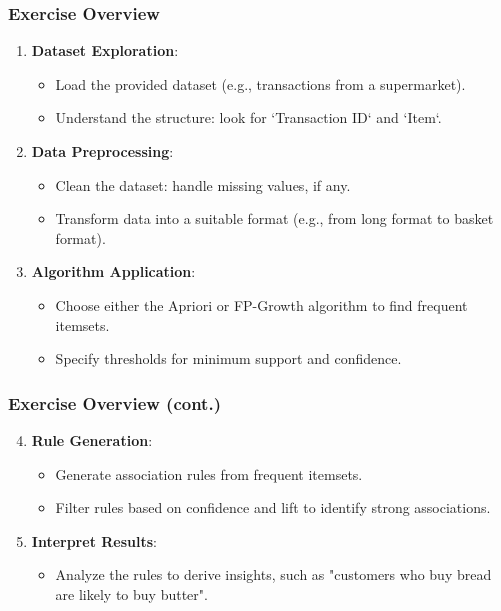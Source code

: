 \documentclass{beamer}
\begin{document}
\begin{frame}[fragile]
    \frametitle{Exercise Overview}
    \begin{enumerate}
        \item \textbf{Dataset Exploration}:
            \begin{itemize}
                \item Load the provided dataset (e.g., transactions from a supermarket).
                \item Understand the structure: look for `Transaction ID` and `Item`.
            \end{itemize}

        \item \textbf{Data Preprocessing}:
            \begin{itemize}
                \item Clean the dataset: handle missing values, if any.
                \item Transform data into a suitable format (e.g., from long format to basket format).
            \end{itemize}

        \item \textbf{Algorithm Application}:
            \begin{itemize}
                \item Choose either the Apriori or FP-Growth algorithm to find frequent itemsets.
                \item Specify thresholds for minimum support and confidence.
            \end{itemize}
    \end{enumerate}
\end{frame}

\begin{frame}[fragile]
    \frametitle{Exercise Overview (cont.)}
    \begin{enumerate}
        \setcounter{enumi}{3}
        \item \textbf{Rule Generation}:
            \begin{itemize}
                \item Generate association rules from frequent itemsets.
                \item Filter rules based on confidence and lift to identify strong associations.
            \end{itemize}

        \item \textbf{Interpret Results}:
            \begin{itemize}
                \item Analyze the rules to derive insights, such as "customers who buy bread are likely to buy butter".
            \end{itemize}
    \end{enumerate}
\end{frame}
\end{document}
